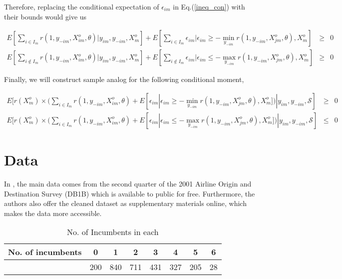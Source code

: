\documentclass[a4paper]{article}
\begin{document}
Therefore, replacing the conditional expectation of $\epsilon_{im}$ in Eq.(\ref{ineq_con}) with their bounds would give us 



\begin{equation}
\begin{array}{rcl}
\displaystyle E[\sum_{i \in I_m}r(1,y_{-im},X^o_{im},\theta)| y_{im}, y_{-im}, X^o_{m}]+ E[\sum_{i \in I_m}\epsilon_{im} |\epsilon_{im} \geq - \min_{y_{-im}}r(1,y_{-im},X^o_{jm},\theta), X^o_{m}] &\geq& 0 \\ 
\displaystyle E[\sum_{i \not\in I_m} r(1,y_{-im},X^o_{im},\theta)| y_{im}, y_{-im}, X^o_{m}]+ E[\sum_{i \not\in I_m} \epsilon_{im} |\epsilon_{im} \leq - \max_{y_{-im}}r(1,y_{-im},X^o_{jm},\theta), X^o_{m}] &\geq& 0
\end{array}
\label{ineq_con_bound}
\end{equation}

\bigskip

Finally, we will construct sample analog for the following conditional moment,

$$
\begin{array}{rcl}
\displaystyle E[r(X^o_m) \times (\sum_{i \in I_m}r(1,y_{-im},X^o_{im},\theta) + E [\epsilon_{im} |\epsilon_{im} \geq - \min_{y_{-im}}r(1,y_{-im},X^o_{jm},\theta), X^o_{m}] )|y_{im}, y_{-im}, \mathcal{S}] &\geq& 0 \\
\displaystyle E[r(X^o_m) \times (\sum_{i \in I_m}r(1,y_{-im},X^o_{im},\theta) + E [\epsilon_{im} |\epsilon_{im} \leq - \max_{y_{-im}}r(1,y_{-im},X^o_{jm},\theta), X^o_{m}] )|y_{im}, y_{-im}, \mathcal{S}] &\leq& 0
\end{array}
$$


\section{Data}

In \cite{ciliberto2009market}, the main data comes from the second quarter of the 2001 Airline Origin and Destination Survey (DB1B) which is available to public for free. Furthermore, the authors also offer the cleaned dataset as supplementary materials online, which makes the data more accessible. 

\begin{table}[h!]
\centering
\caption{No. of Incumbents in each }
\begin{tabular}{cccccccc} 
 \hline
 No. of incumbents & 0 & 1 & 2 & 3 & 4 & 5 & 6 \\ 
 \hline
 & 200 & 840 & 711 & 431 & 327 & 205 & 28 \\ 
 \hline
\end{tabular}
\label{no.of.icb}

\end{table}
\end{document}

